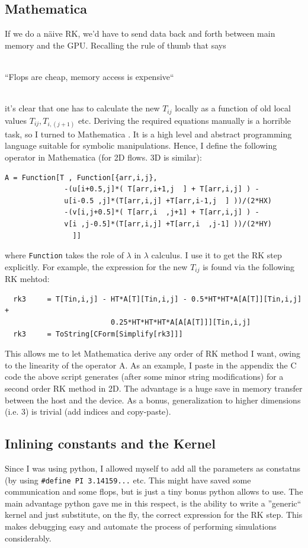 \documentclass[paper=a4, fontsize=11pt]{scrartcl} %
\numberwithin{equation}{section} %
\numberwithin{figure}{section} %
\numberwithin{table}{section} %
\newcommand{\coder}[1]{\texttt{#1}}
\begin{document}
\subsection{Mathematica} 
If we do a n\"aive RK, we'd have to
send data back and forth between main memory and the GPU. Recalling the rule of thumb that says 
\\
\\
\centerline{\Large{``Flops are cheap, memory access is expensive``}}
\\

 it's clear that one has to calculate the new $T_{ij}$ locally as a function of old local values $T_{ij}, T_{i,(j+1)}$ etc. 
 Deriving the required equations manually is a horrible task, so I turned to Mathematica \cite{math}. It is a high level and abstract
programming language suitable for symbolic manipulations. 
Hence, I define the following operator in Mathematica (for 2D flows. 3D is similar):

\begin{verbatim}
A = Function[T , Function[{arr,i,j},  
			  -(u[i+0.5,j]*( T[arr,i+1,j  ] + T[arr,i,j] ) - 
			  u[i-0.5 ,j]*(T[arr,i,j] +T[arr,i-1,j  ] ))/(2*HX)  
			  -(v[i,j+0.5]*( T[arr,i  ,j+1] + T[arr,i,j] ) - 
			  v[i ,j-0.5]*(T[arr,i,j] +T[arr,i  ,j-1] ))/(2*HY)
 				]]
\end{verbatim}
where \coder{Function} takes the role of $\lambda$ in $\lambda$ calculus.
I use it to get the RK step explicitly. For example, the expression for the 
new $T_{ij}$ is found via the following RK mehtod:
\begin{verbatim}
  rk3     = T[Tin,i,j] - HT*A[T][Tin,i,j] - 0.5*HT*HT*A[A[T]][Tin,i,j] +
                         0.25*HT*HT*HT*A[A[A[T]]][Tin,i,j]
  rk3     = ToString[CForm[Simplify[rk3]]]
\end{verbatim}

This allows me to let Mathematica derive any order of RK method I want, owing to the linearity of the operator A. 
As an example, I paste in the appendix the C code the above script generates (after some minor string modifications) for a
second order RK method in 2D. 
The advantage is a huge save in memory transfer between the host and the device. As a bonus, generalization to higher
dimensions (i.e. 3) is trivial (add indices and copy-paste).

\subsection{Inlining constants and the Kernel}
Since I was using python, I allowed myself to add all the parameters as constatns (by using \coder{\#define PI 3.14159...} etc. This 
might have saved some communication and some flops, but is just a tiny bonus python allows to use. The main advantage python gave me
in this respect, is the ability to write a ''generic`` kernel and just substitute, on the fly, the correct expression for the RK step.
This makes debugging easy and automate the process of performing simulations considerably.
\end{document}
